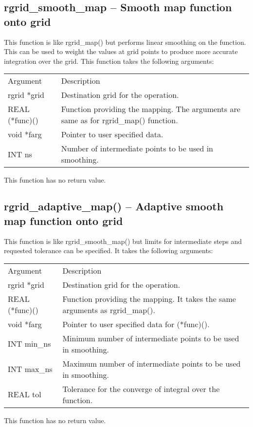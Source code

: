 \documentclass[12pt,letterpaper]{report}
\begin{document}
\subsection{rgrid\_smooth\_map -- Smooth map function onto grid}

This function is like rgrid\_map() but performs linear smoothing on the function. This can be used to weight the values at grid points to produce more accurate integration over the grid. This function takes the following arguments:
\begin{longtable}{p{} p{}}
Argument & Description\\
\cline{1-2}
rgrid *grid & Destination grid for the operation.\\
REAL (*func)() & Function providing the mapping. The arguments are same as for rgrid\_map() function.\\
void *farg & Pointer to user specified data.\\
INT ns & Number of intermediate points to be used in smoothing.\\
\end{longtable}
\noindent
This function has no return value.

\subsection{rgrid\_adaptive\_map() -- Adaptive smooth map function onto grid}

This function is like rgrid\_smooth\_map() but limits for intermediate steps and requested tolerance can be specified. It takes the following arguments:
\begin{longtable}{p{} p{}}
Argument & Description\\
\cline{1-2}
rgrid *grid & Destination grid for the operation.\\
REAL (*func)() & Function providing the mapping. It takes the same arguments as rgrid\_map().\\
void *farg & Pointer to user specified data for (*func)().\\
INT min\_ns & Minimum number of intermediate points to be used in smoothing.\\
INT max\_ns & Maximum number of intermediate points to be used in smoothing.\\
REAL tol & Tolerance for the converge of integral over the function.\\
\end{longtable}
\noindent
This function has no return value.
\end{document}
